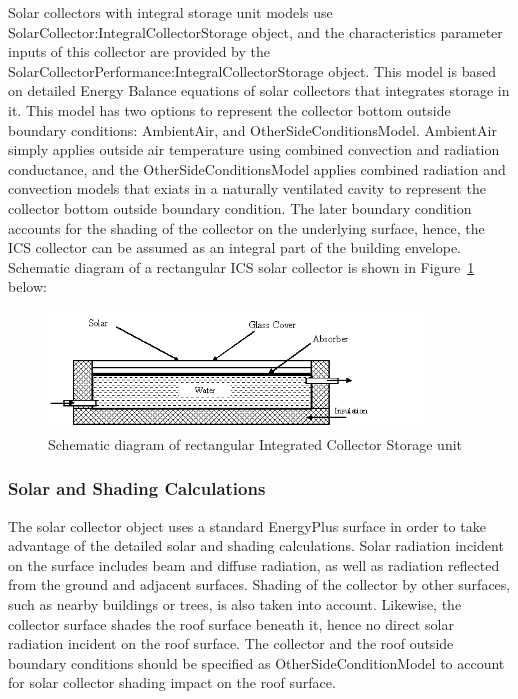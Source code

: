 Solar collectors with integral storage unit models use SolarCollector:IntegralCollectorStorage object, and the characteristics parameter inputs of this collector are provided by the SolarCollectorPerformance:IntegralCollectorStorage object. This model is based on detailed Energy Balance equations of solar collectors that integrates storage in it. This model has two options to represent the collector bottom outside boundary conditions: AmbientAir, and OtherSideConditionsModel. AmbientAir simply applies outside air temperature using combined convection and radiation conductance, and the OtherSideConditionsModel applies combined radiation and convection models that exiats in a naturally ventilated cavity to represent the collector bottom outside boundary condition. The later boundary condition accounts for the shading of the collector on the underlying surface, hence, the ICS collector can be assumed as an integral part of the building envelope. Schematic diagram of a rectangular ICS solar collector is shown in Figure~\ref{fig:schematic-diagram-of-rectangular-integrated} below:

\begin{figure}[hbtp] %
\centering
\includegraphics[width=0.9\textwidth, height=0.9\textheight, keepaspectratio=true]{media/image6502.png}
\caption{Schematic diagram of rectangular Integrated Collector Storage unit \protect \label{fig:schematic-diagram-of-rectangular-integrated}}
\end{figure}

\subsubsection{Solar and Shading Calculations}\label{solar-and-shading-calculations-1}

The solar collector object uses a standard EnergyPlus surface in order to take advantage of the detailed solar and shading calculations. Solar radiation incident on the surface includes beam and diffuse radiation, as well as radiation reflected from the ground and adjacent surfaces. Shading of the collector by other surfaces, such as nearby buildings or trees, is also taken into account. Likewise, the collector surface shades the roof surface beneath it, hence no direct solar radiation incident on the roof surface. The collector and the roof outside boundary conditions should be specified as OtherSideConditionModel to account for solar collector shading impact on the roof surface.

